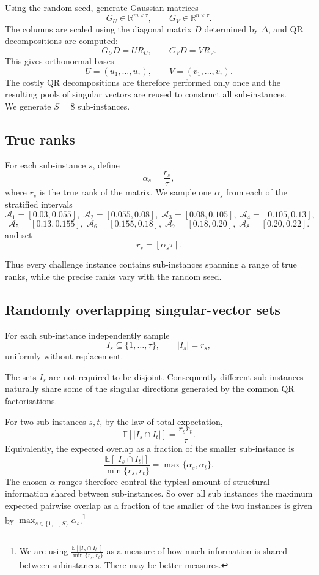 \documentclass[12pt, legalpaper]{article}
\begin{document}
Using the random seed, generate Gaussian matrices
\[
G_U\in\mathbb{R}^{m\times\tau},
\qquad
G_V\in\mathbb{R}^{n\times\tau}.
\]
The columns are scaled
using the diagonal matrix $D$ determined by $\Delta$, and QR decompositions
are computed:
\[
G_UD=UR_U,
\qquad
G_VD=VR_V.
\]
This gives orthonormal bases
\[
U=(u_1,\ldots,u_\tau),
\qquad
V=(v_1,\ldots,v_\tau).
\]
The costly QR decompositions are therefore performed only once and the
resulting pools of singular vectors are reused to construct all
sub-instances.\\

We generate $S=8$ sub-instances.

\subsection{True ranks}

For each sub-instance $s$, define
\[
\alpha_s=\frac{r_s}{\tau},
\]
where $r_s$ is the true rank of the matrix. We sample one $\alpha_s$ from
each of the stratified intervals
\[
\mathcal A_1=[0.03,0.055],\;
\mathcal A_2=[0.055,0.08],\;
\mathcal A_3=[0.08,0.105],\;
\mathcal A_4=[0.105,0.13],
\]
\[
\mathcal A_5=[0.13,0.155],\;
\mathcal A_6=[0.155,0.18],\;
\mathcal A_7=[0.18,0.20],\;
\mathcal A_8=[0.20,0.22].
\]
and set
\[
r_s=\left\lfloor\alpha_s\tau\right\rceil.
\]

Thus every challenge instance contains sub-instances spanning a range of
true ranks, while the precise ranks vary with the random seed.

\subsection{Randomly overlapping singular-vector sets}

For each sub-instance independently sample
\[
I_s\subseteq\{1,\ldots,\tau\},
\qquad |I_s|=r_s,
\]
uniformly without replacement.

The sets $I_s$ are not required to be disjoint. Consequently different
sub-instances naturally share some of the singular directions generated by
the common QR factorisations.

For two sub-instances $s,t$, by the law of total expectation,
\[
\mathbb E\!\left[|I_s\cap I_t|\right]
=
\frac{r_sr_t}{\tau}.
\]
Equivalently, the expected overlap as a fraction of the smaller
sub-instance is
\[
\frac{\mathbb E[|I_s\cap I_t|]}
     {\min\{r_s,r_t\}}
=
\max\{\alpha_s,\alpha_t\}.
\]
The chosen $\alpha$ ranges therefore control the typical amount of
structural information shared between sub-instances. So over all sub instances the maximum expected pairwise overlap as a fraction of the smaller of the two instances is given by $\max_{s\in \{1,\ldots,S\}} \alpha_s$.\footnote{We are using $\frac{\mathbb E[|I_s\cap I_t|]}
     {\min\{r_s,r_t\}}$ as a measure of how much information is shared between subinstances. There may be better measures.}
\end{document}

